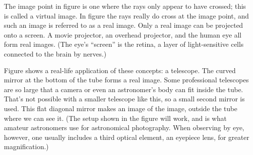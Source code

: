 The image point in figure
 is one where the rays only appear to have crossed; this is called
a virtual image. In figure  the rays really do cross at the image point,
and such an image is referred to as a real image. Only a real image can be projected onto a screen.
A movie projector, an overhead projector, and the human eye all form real images. (The eye's
``screen'' is the retina, a layer of light-sensitive cells connected to the brain by nerves.)





\vfill
{}
Figure 
shows a real-life application of these concepts: a
telescope. The curved mirror at the bottom of the tube forms a real image.
Some professional telescopes are so large that a camera or even an astronomer's
body can fit inside the tube. That's not possible with a smaller telescope like this,
so a small second mirror is used. This flat diagonal mirror makes an image of the
image, outside the tube where we can see it. (The setup shown in the figure
will work, and is what amateur astronomers use for astronomical photography.
When observing by eye, however, one usually includes a third optical element, an eyepiece lens, for
greater magnification.)

